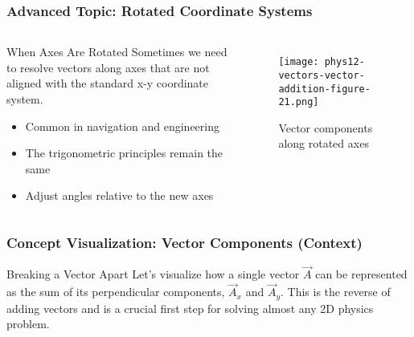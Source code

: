 \documentclass{beamer}
\begin{document}
\begin{frame}
\frametitle{Advanced Topic: Rotated Coordinate Systems}
\begin{columns}
\begin{block}{When Axes Are Rotated}
Sometimes we need to resolve vectors along axes that are not aligned with the standard x-y coordinate system.
\begin{itemize}
    \item Common in navigation and engineering
    \item The trigonometric principles remain the same
    \item Adjust angles relative to the new axes
\end{itemize}
\end{block}

\begin{figure}
\centering
\texttt{[image: phys12-vectors-vector-addition-figure-21.png]}
\caption{Vector components along rotated axes}
\end{figure}
\end{columns}
\end{frame}

\begin{frame}
\frametitle{Concept Visualization: Vector Components (Context)}
\begin{block}{Breaking a Vector Apart}
Let's visualize how a single vector $\vec{A}$ can be represented as the sum of its perpendicular components, $\vec{A}_x$ and $\vec{A}_y$.
\vfill
This is the reverse of adding vectors and is a crucial first step for solving almost any 2D physics problem.
\end{block}
\end{frame}
\end{document}
